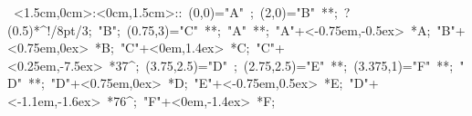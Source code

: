 
%

\hbox{
\xy    <1.5cm,0cm>:<0cm,1.5cm>::
       (0,0)="A" ; (2,0)="B" **\dir{-}; ?(0.5)*^!/8pt/{3}; "B";
       (0.75,3)="C" **\dir{-}; "A" **\dir{-};
       "A"+<-0.75em,-0.5ex> *{A};
       "B"+<0.75em,0ex> *{B};
       "C"+<0em,1.4ex> *{C};
       "C"+<0.25em,-7.5ex> *{37^\circ};
       (3.75,2.5)="D" ; (2.75,2.5)="E" **\dir{-}; 
       (3.375,1)="F" **\dir{-}; "D" **\dir{-};
       "D"+<0.75em,0ex> *{D};
       "E"+<-0.75em,0.5ex> *{E};
       "D"+<-1.1em,-1.6ex> *{76^\circ};
       "F"+<0em,-1.4ex> *{F};
       \endxy}
	   
